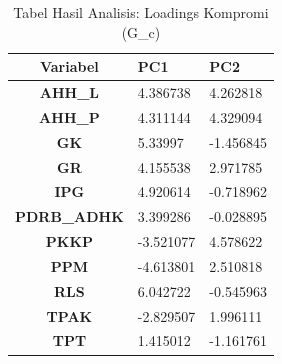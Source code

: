 \begin{table}[H]
\centering
\caption{Tabel Hasil Analisis: Loadings Kompromi (G_c)} \label{tab:statis_detail}
\begin{tabular}{|c|p{2.3cm}|p{2.3cm}|}
\hline
\textbf{Variabel} & \textbf{PC1} & \textbf{PC2} \\ \hline
\textbf{AHH_L} & 4.386738 & 4.262818 \\ \hline
\textbf{AHH_P} & 4.311144 & 4.329094 \\ \hline
\textbf{GK} & 5.33997 & -1.456845 \\ \hline
\textbf{GR} & 4.155538 & 2.971785 \\ \hline
\textbf{IPG} & 4.920614 & -0.718962 \\ \hline
\textbf{PDRB_ADHK} & 3.399286 & -0.028895 \\ \hline
\textbf{PKKP} & -3.521077 & 4.578622 \\ \hline
\textbf{PPM} & -4.613801 & 2.510818 \\ \hline
\textbf{RLS} & 6.042722 & -0.545963 \\ \hline
\textbf{TPAK} & -2.829507 & 1.996111 \\ \hline
\textbf{TPT} & 1.415012 & -1.161761 \\ \hline
\end{tabular}
\end{table}